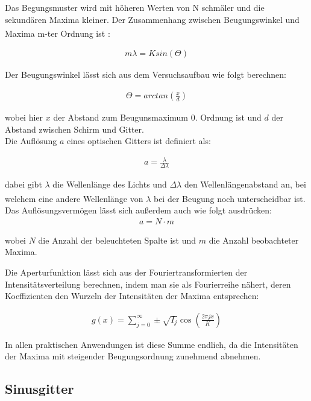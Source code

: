 \documentclass[12pt]{article}
\begin{document}
Das Begungsmuster wird mit höheren Werten von N schmäler und die sekundären Maxima kleiner. Der Zusammenhang zwischen Beugungswinkel und Maxima m-ter Ordnung ist \textsuperscript{\cite{Demtröder}}:

\begin{align}
m\lambda = Ksin(\Theta) \label{11} 
\end{align}

Der Beugungswinkel lässt sich aus dem Versuchsaufbau wie folgt berechnen:

\begin{align}
\Theta = \mathit{arctan}\left( \frac{x}{d}\right) 
\end{align}

wobei hier $x$ der Abstand zum Beugunsmaximum 0. Ordnung ist und $d$ der Abstand zwischen Schirm und Gitter.\\

Die Auflösung $a$ eines optischen Gitters ist definiert als:  \label{aufloesung}

\begin{align}
a = \frac{\lambda}{\Delta \lambda}
\end{align}

dabei gibt $\lambda$ die Wellenlänge des Lichts und $\Delta \lambda$ den Wellenlängenabstand an, bei welchem eine andere Wellenlänge von $\lambda$ bei der Beugung noch unterscheidbar ist.\textsuperscript{\cite{anleitung}}
Das Auflösungsvermögen lässt sich außerdem auch wie folgt ausdrücken:
\begin{align}
a = N \cdot m 
\end{align}

wobei $N$ die Anzahl der beleuchteten Spalte ist und $m$ die Anzahl beobachteter Maxima.

Die Aperturfunktion lässt sich aus der Fouriertransformierten der Intensitätsverteilung berechnen, indem man sie als Fourierreihe nähert, deren Koeffizienten den Wurzeln der Intensitäten der Maxima entsprechen:

\begin{align}
g(x) = \sum_{j = 0}^{\infty} \pm \sqrt{I_j}\cos\left( \frac{2 \pi j x}{K}\right) \label{Fourier1}
\end{align} 

In allen praktischen Anwendungen ist diese Summe endlich, da die Intensitäten der Maxima mit steigender Beugungsordnung zunehmend abnehmen. 

\subsection{Sinusgitter}
\end{document}
